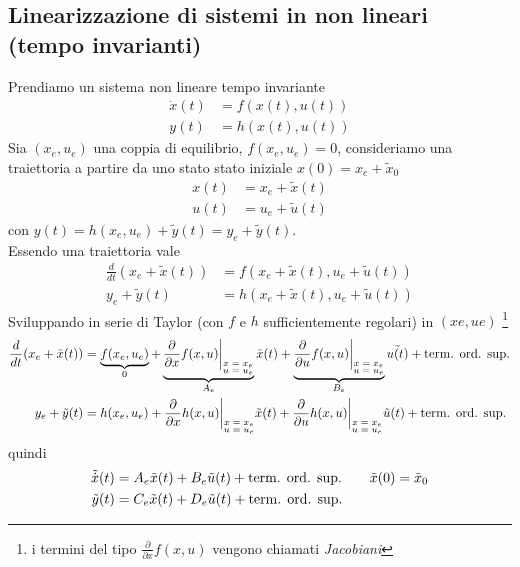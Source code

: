 \documentclass{article}
\numberwithin{equation}{subsection}
\let\oldsubsection\subsection%
\renewcommand{\subsection}{%
  \renewcommand{\theequation}{\thesubsection.\arabic{equation}}%
  \oldsubsection}%
\begin{document}
\subsection{Linearizzazione di sistemi in non lineari (tempo invarianti)}
Prendiamo un  sistema non lineare tempo invariante
\begin{align*}
    \dot x(t) &= f (x(t), u(t))\\
    y(t) &= h(x(t), u(t))
\end{align*}
Sia $(x_e,u_e)$ una coppia di equilibrio, $f(x_e,u_e)=0$, consideriamo una traiettoria a partire da uno stato stato iniziale $x(0)=x_e+ \tilde{x}_0$ 
\begin{align*}
    x(t) &= x_e + \tilde{x}(t)\\
    u(t) &= u_e + \tilde{u}(t)
\end{align*}
con $y(t) = h(x_e , u_e ) + \tilde{y}(t) = y_e + \tilde{y}(t)$.\\
Essendo una traiettoria vale
\begin{align*}
    \frac{d}{dt}(x_e + \tilde{x}(t)) &= f (x_e + \tilde{x}(t), u_e + \tilde{u}(t))\\
    y_e + \tilde{y}(t) &= h(x_e+\tilde{x}(t), u_e+ \tilde{u}(t))
\end{align*}
Sviluppando in serie di Taylor (con $f$ e $h$ sufficientemente regolari) in $(xe , ue )$ \footnote[1]{i termini del tipo $\frac{\partial}{\partial x}f(x,u)$ vengono chiamati \textit{Jacobiani}}
\begin{align*}
    \frac{d}{dt}(x_e + \tilde{x}(t)) &= \underbrace{f(x_e,u_e)}_{0} + \underbrace{\frac{\partial}{\partial x}f(x,u)\bigg|_{\substack{\text{$x=x_e$} \\ \text{$u=u_e$}}}}_{A_e} \tilde{x}(t) + \underbrace{\frac{\partial}{\partial u}f(x,u)\bigg|_{\substack{\text{$x=x_e$} \\ \text{$u=u_e$}}}}_{B_e} \tilde{u(t)} + \text{term. ord. sup.}\\
    y_e+\tilde{y}(t) &= h(x_e,u_e) + \frac{\partial}{\partial x}h(x,u) \bigg|_{\substack{\text{$x=x_e$} \\ \text{$u=u_e$}}} \tilde{x}(t) + \frac{\partial}{\partial u}h(x,u) \bigg|_{\substack{\text{$x=x_e$} \\ \text{$u=u_e$}}} \tilde{u}(t) + \text{term. ord. sup.}
\end{align*} 
quindi
\begin{align*}
    \tilde{\dot x}(t) &= A_e \tilde{x}(t) + B_e \tilde{u}(t) + \T{term. ord. sup.} \tag*{$\tilde{x}(0) = \tilde{x}_0$}\\
    \tilde{y}(t) &= C_e \tilde{x}(t) + D_e\tilde{u}(t) + \T{term. ord. sup.}
\end{align*}
\end{document}
